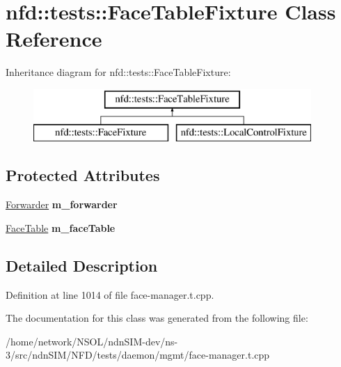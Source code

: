 \hypertarget{classnfd_1_1tests_1_1FaceTableFixture}{}\section{nfd\+:\+:tests\+:\+:Face\+Table\+Fixture Class Reference}
\label{classnfd_1_1tests_1_1FaceTableFixture}
Inheritance diagram for nfd\+:\+:tests\+:\+:Face\+Table\+Fixture\+:\begin{figure}[H]
\begin{center}
\leavevmode
\includegraphics[height=2.000000cm]{classnfd_1_1tests_1_1FaceTableFixture}
\end{center}
\end{figure}
\subsection*{Protected Attributes}
\begin{DoxyCompactItemize}
\item 
\hyperlink{classnfd_1_1Forwarder}{Forwarder} {\bfseries m\+\_\+forwarder}\hypertarget{classnfd_1_1tests_1_1FaceTableFixture_a0200fa0dd76bd8a0db52c44a374559c8}{}\label{classnfd_1_1tests_1_1FaceTableFixture_a0200fa0dd76bd8a0db52c44a374559c8}

\item 
\hyperlink{classnfd_1_1FaceTable}{Face\+Table} {\bfseries m\+\_\+face\+Table}\hypertarget{classnfd_1_1tests_1_1FaceTableFixture_a87160881a25fcf428bd7e56485691ff1}{}\label{classnfd_1_1tests_1_1FaceTableFixture_a87160881a25fcf428bd7e56485691ff1}

\end{DoxyCompactItemize}


\subsection{Detailed Description}


Definition at line 1014 of file face-\/manager.\+t.\+cpp.



The documentation for this class was generated from the following file\+:\begin{DoxyCompactItemize}
\item 
/home/network/\+N\+S\+O\+L/ndn\+S\+I\+M-\/dev/ns-\/3/src/ndn\+S\+I\+M/\+N\+F\+D/tests/daemon/mgmt/face-\/manager.\+t.\+cpp\end{DoxyCompactItemize}
